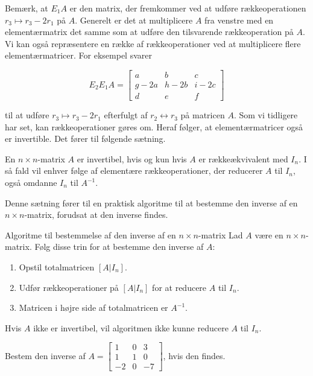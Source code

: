 Bemærk, at $E_1 A$ er den matrix, der fremkommer ved at udføre rækkeoperationen $r_3 \mapsto r_3-2 r_1$ på $A$. Generelt er det at multiplicere $A$ fra venstre med en elementærmatrix det samme som at udføre den tilsvarende rækkeoperation på $A$. Vi kan også repræsentere en række af rækkeoperationer ved at multiplicere flere elementærmatricer. For eksempel svarer

\[
E_2 E_1 A=\left[\begin{array}{ccc}
a & b & c \\
g-2 a & h-2 b & i-2 c \\
d & e & f
\end{array}\right]
\]

til at udføre $r_3 \mapsto r_3-2 r_1$ efterfulgt af $r_2 \longleftrightarrow r_3$ på matricen $A$.
Som vi tidligere har set, kan rækkeoperationer gøres om. Heraf følger, at elementærmatricer også er invertible. Det fører til følgende sætning.

\begin{theorem}
    En $n \times n$-matrix $A$ er invertibel, hvis og kun hvis $A$ er rækkeækvivalent med $I_n$. I så fald vil enhver følge af elementære rækkeoperationer, der reducerer $A$ til $I_n$, også omdanne $I_n$ til $A^{-1}$.
\end{theorem}

Denne sætning fører til en praktisk algoritme til at bestemme den inverse af en $n \times n$-matrix, forudsat at den inverse findes.

\begin{custombox}{Algoritme til bestemmelse af den inverse af en $n \times n$-matrix}
    Lad $A$ være en $n \times n$-matrix. Følg disse trin for at bestemme den inverse af $A$:
    \begin{enumerate}
        \item Opstil totalmatricen $[A | I_n]$.
        \item Udfør rækkeoperationer på $[A | I_n]$ for at reducere $A$ til $I_n$.
        \item Matricen i højre side af totalmatricen er $A^{-1}$.
    \end{enumerate}

    Hvis $A$ ikke er invertibel, vil algoritmen ikke kunne reducere $A$ til $I_n$.
\end{custombox}

\begin{example} Bestem den inverse af $A=\left[\begin{array}{rrr}1 & 0 & 3 \\ 1 & 1 & 0 \\ -2 & 0 & -7\end{array}\right]$, hvis den findes.    
\end{example}

